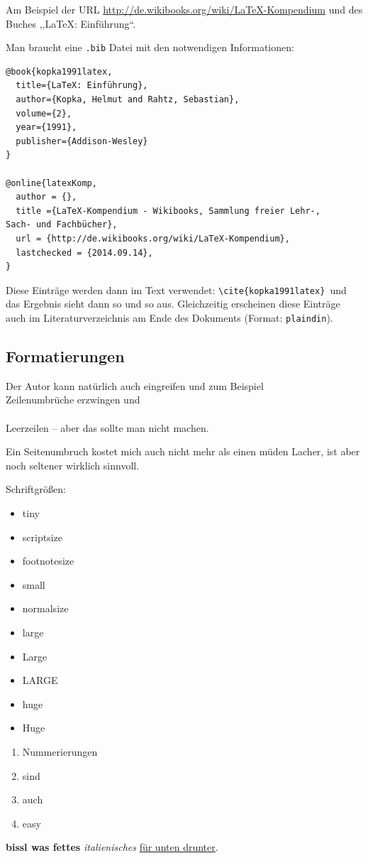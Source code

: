 \documentclass[a4paper,ngerman,naustrian,DIV=12,BCOR=1cm]{scrbook}
\begin{document}
Am Beispiel der URL \url{http://de.wikibooks.org/wiki/LaTeX-Kompendium}
und des Buches ,,\LaTeX{}: Einführung``.

Man braucht eine \texttt{.bib} Datei mit den notwendigen Informationen:

\begin{lstlisting}[language={[LaTeX]TeX},inputencoding={utf8},extendedchars=false]
@book{kopka1991latex,
  title={LaTeX: Einführung},
  author={Kopka, Helmut and Rahtz, Sebastian},
  volume={2},
  year={1991},
  publisher={Addison-Wesley}
}

@online{latexKomp,
  author = {},
  title ={LaTeX-Kompendium - Wikibooks, Sammlung freier Lehr-,
Sach- und Fachbücher},
  url = {http://de.wikibooks.org/wiki/LaTeX-Kompendium},
  lastchecked = {2014.09.14},
}
\end{lstlisting}

Diese Einträge werden dann im Text verwendet: \texttt{\textbackslash{}cite\{kopka1991latex\}
}und das Ergebnis sieht dann so \cite{kopka1991latex} und so \cite{latexKomp}
aus. Gleichzeitig erscheinen diese Einträge auch im Literaturverzeichnis
am Ende des Dokuments (Format: \texttt{plaindin}).


\subsection{Formatierungen }

Der Autor kann natürlich auch eingreifen und zum Beispiel\\
Zeilenumbrüche erzwingen und \\
\\
Leerzeilen -- aber das sollte man nicht machen. \newpage{}

Ein Seitenumbruch kostet mich auch nicht mehr als einen müden Lacher,
ist aber noch seltener wirklich sinnvoll.

Schriftgrößen:
\begin{itemize}
\item {\tiny{}tiny}
\item {\scriptsize{}scriptsize}
\item {\footnotesize{}footnotesize}
\item {\small{}small}
\item normalsize
\item {\large{}large}
\item {\Large{}Large}
\item {\LARGE{}LARGE}
\item {\huge{}huge}
\item {\Huge{}Huge} \end{itemize}
\begin{enumerate}
\item Nummerierungen
\item sind
\item auch
\item easy
\end{enumerate}
\textbf{bissl was fettes} \textit{italienisches} \uline{für unten
drunter}.
\end{document}

